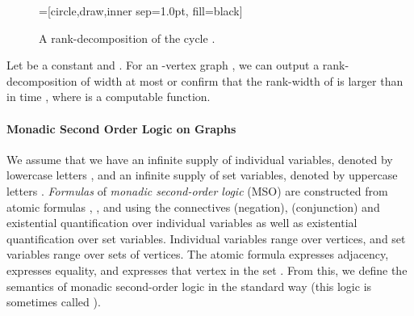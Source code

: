 \documentclass{llncs}
\begin{document}
\begin{figure}[ht]
\vspace{-0.6cm}
\centering
  =[circle,draw,inner sep=1.0pt, fill=black]
\vspace{-0.8cm}
\caption{A rank-decomposition of the cycle .}
\label{fig:rdecC5}
\vspace{-0.6cm}
\end{figure}


\begin{theorem}\label{thm:rankdecomp} Let  be a constant and
  . For an -vertex graph , we can output a
  rank-decomposition of width at most  or confirm that the
  rank-width of  is larger than  in time , where  is a computable function.
\end{theorem}

\paragraph{Monadic Second Order Logic on Graphs}
We assume that we have an infinite supply of individual variables,
denoted by lowercase letters , and an infinite supply of set
variables, denoted by uppercase letters . \emph{Formulas} of
\emph{monadic second-order logic} (MSO) are constructed from atomic
formulas , , and  using the connectives 
(negation),  (conjunction) and existential quantification
 over individual variables as well as existential
quantification  over set variables. Individual variables
range over vertices, and set variables range over sets of
vertices. The atomic formula  expresses adjacency, 
expresses equality, and  expresses that vertex  in the set
. From this, we define the semantics of monadic second-order logic
in the standard way (this logic is sometimes called ).
\end{document}

